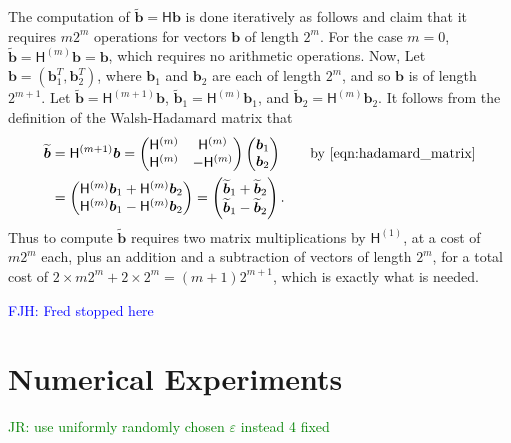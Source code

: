 \documentclass[graybox,footinfo]{svmult}
\newcommand{\bm}[1]{\boldsymbol{#1}}
\newcommand{\vb}{\bm{b}}
\newcommand{\tvb}{\widetilde{\vb}}
\newcommand{\mH}{\mathsf{H}}
\newcommand{\FJHNote}[1]{{\textcolor{blue}{FJH: #1}}}
\newcommand{\JRNote}[1]{{\textcolor{green}{JR: #1}}}
\begin{document}
The computation of $\tvb =\mH \vb$ is done iteratively as follows and claim that it requires $m2^m$ operations for vectors $\vb$ of length $2^m$. For the case $m=0$, $\tvb = \mH^{(m)} \vb = \vb$, which requires no arithmetic operations.  Now, Let $\vb = (\vb_1^{T},  \vb_2^{T})$, where $\vb_1$ and $\vb_2$ are each of length $2^m$, and so $\vb$ is of length $2^{m+1}$.  Let $\tvb = \mH^{(m+1)} \vb$,  $\tvb_1 = \mH^{(m)} \vb_1$, and $\tvb_2 = \mH^{(m)} \vb_2$.  It follows from the definition of the Walsh-Hadamard matrix that 
\begin{align*}
\tvb &= \mH^{({m+1})} \vb = \begin{pmatrix}
\mH^{(m)} & \mH^{(m)} \\ \mH^{(m)} & - \mH^{(m)}
\end{pmatrix} 
\begin{pmatrix}
\vb_1 \\ \vb_2
\end{pmatrix} \qquad \text{by \eqref{eqn:hadamard_matrix}} \\
&= 
\begin{pmatrix}
\mH^{(m)} \vb_1 + \mH^{(m)}\vb_2 \\ 
\mH^{(m)} \vb_1 - \mH^{(m)} \vb_2
\end{pmatrix}
= 
\begin{pmatrix}
\tvb_1 + \tvb_2 \\ 
\tvb_1 - \tvb_2
\end{pmatrix}.
\end{align*}
Thus to compute $\tvb$ requires two matrix multiplications by $\mH^{(1)}$, at a cost of $m 2^m$ each, plus an addition and a subtraction of vectors of length $2^m$, for a total cost of $2 \times m 2^m + 2 \times 2^m = (m+1) 2^{m+1}$, which is exactly what is needed.


\FJHNote{Fred stopped here}







\section{Numerical Experiments}

\label{sec:NumExp}

\JRNote{use uniformly randomly chosen $\varepsilon$ instead 4 fixed}
\end{document}
